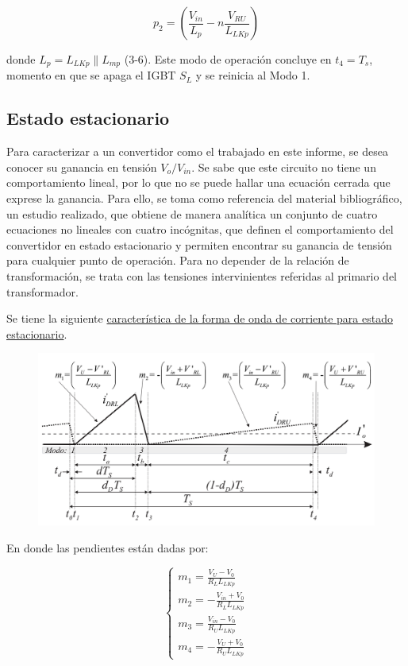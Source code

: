 \[
p_2 = \left( \frac{V_{in}}{L_p} - n \frac{V_{RU}}{L_{LKp}} \right)
\]

donde \( L_p = L_{LKp} \parallel L_{mp} \) (3-6). Este modo de operación concluye en \( t_4 = T_s \), momento en que se apaga el IGBT \( S_L \) y se reinicia al Modo 1.

\subsection{Estado estacionario}

Para caracterizar a un convertidor como el trabajado en este informe, se desea conocer su ganancia en tensión $V_o/V_{in}$. Se sabe que este circuito no tiene un comportamiento lineal, por lo que no se puede hallar una ecuación cerrada que exprese la ganancia. Para ello, se toma como referencia del material bibliográfico, un estudio realizado, que obtiene de manera analítica un conjunto de cuatro ecuaciones no lineales con cuatro incógnitas, que definen el comportamiento del convertidor en estado estacionario y permiten encontrar su ganancia de tensión para cualquier punto de operación. Para no depender de la relación de transformación, se trata con las tensiones intervinientes referidas al primario del transformador. 

Se tiene la siguiente \hyperref[fig:corrienteestacionario]{característica de la forma de onda de corriente para estado estacionario}.

\begin{figure}
	\centering
	\includegraphics[width=0.7\linewidth]{img/corrienteEstacionario}
	\caption{}
	\label{fig:corrienteestacionario}
\end{figure}

En donde las pendientes están dadas por:

$$
\begin{cases}
	m_1 = \frac{V_U - V_0}{R_L L_{LKp}} \\
	m_2 = -\frac{V_{in} + V_0}{R_L L_{LKp}} \\
	m_3 = \frac{V_{in} - V_0}{R_U L_{LKp}} \\
	m_4 = -\frac{V_U + V_0}{R_U L_{LKp}}
\end{cases}
$$

